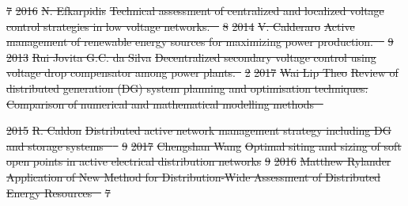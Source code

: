 \documentclass[12pt, letterpaper]{report}
\providecommand{\DIFdeltex}[1]{{\protect\color{red}\sout{#1}}}                      %
\providecommand{\DIFdel}[1]{\texorpdfstring{\DIFdeltex{#1}}{}} %
\begin{document}
\DIFdel{7 }%
\DIFdel{2016}%
\DIFdel{N. Efkarpidis}%
\DIFdel{Technical assessment of centralized and localized voltage control	 strategies in low voltage networks. \mbox{%
\cite{Efkarpidis2016}}%
}%
\DIFdel{8
	  }%
\DIFdel{2014}%
\DIFdel{V. Calderaro}%
\DIFdel{Active management of renewable energy sources for maximizing	 power production.\mbox{%
\cite{Calderaro2014} }%
}%
\DIFdel{9
	   }%
\DIFdel{2013  }%
\DIFdel{Rui Jovita G.C. da Silva	 }%
\DIFdel{Decentralized secondary voltage control using voltage drop compensator
	 among power plants.\mbox{%
\cite{DaSilva2013}}%
}%
\DIFdel{2 }%
\DIFdel{2017 }%
\DIFdel{Wai Lip Theo }%
\DIFdel{Review of distributed generation (DG) system planning and  optimisation techniques: Comparison of numerical and mathematical modelling methods \mbox{%
\cite{Theo2017}}%
}%

\DIFdel{2015 }%
\DIFdel{R.
Caldon }%
\DIFdel{Distributed active network management strategy  including DG and storage systems \mbox{%
\cite{Caldon2015a} }%
}%
\DIFdel{9 }%
\DIFdel{2017 }%
\DIFdel{Chengshan Wang }%
\DIFdel{Optimal siting and sizing of soft open points in active electrical
	 distribution networks }%
\DIFdel{9 }%
\DIFdel{2016 }%
\DIFdel{Matthew Rylander }%
\DIFdel{Application of New Method for Distribution-Wide Assessment of Distributed Energy Resources \mbox{%
\cite{Rylander2016a}}%
}%
\DIFdel{7}%
\end{document}
